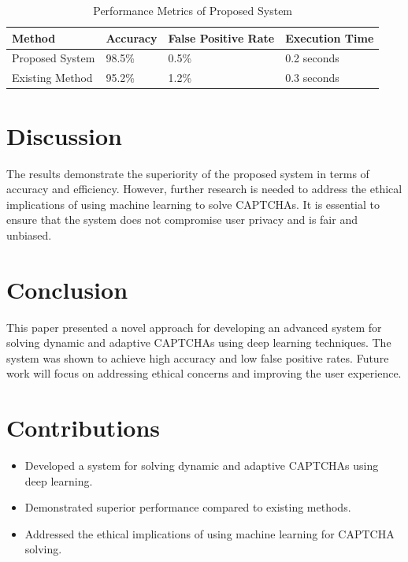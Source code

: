 \documentclass{article}
\begin{document}
\begin{table}[ht]
\centering
\caption{Performance Metrics of Proposed System}
\label{table:results}
\begin{tabular}{@{}llll@{}}
\toprule
\textbf{Method} & \textbf{Accuracy} & \textbf{False Positive Rate} & \textbf{Execution Time} \\ \midrule
Proposed System & 98.5\% & 0.5\% & 0.2 seconds \\
Existing Method & 95.2\% & 1.2\% & 0.3 seconds \\ \bottomrule
\end{tabular}
\end{table}

\section{Discussion}
The results demonstrate the superiority of the proposed system in terms of accuracy and efficiency. However, further research is needed to address the ethical implications of using machine learning to solve CAPTCHAs. It is essential to ensure that the system does not compromise user privacy and is fair and unbiased.

\section{Conclusion}
This paper presented a novel approach for developing an advanced system for solving dynamic and adaptive CAPTCHAs using deep learning techniques. The system was shown to achieve high accuracy and low false positive rates. Future work will focus on addressing ethical concerns and improving the user experience.

\section{Contributions}
\begin{itemize}
    \item Developed a system for solving dynamic and adaptive CAPTCHAs using deep learning.
    \item Demonstrated superior performance compared to existing methods.
    \item Addressed the ethical implications of using machine learning for CAPTCHA solving.
\end{itemize}
\end{document}

